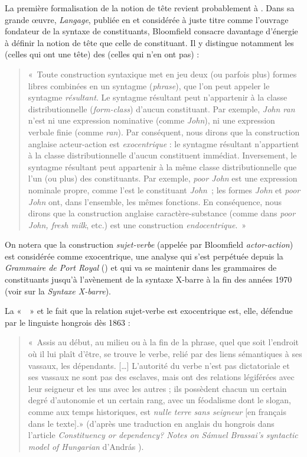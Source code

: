 {    La première formalisation de la notion de tête revient probablement à . Dans sa grande œuvre, \textit{Langage}, publiée en \citeyear{bloomfield1933language} et considérée à juste titre comme l’ouvrage fondateur de la syntaxe de constituants, Bloomfield consacre davantage d’énergie à définir la notion de tête que celle de constituant. Il y distingue notamment les  (celles qui ont une tête) des  (celles qui n’en ont pas) : 
    \begin{quote}«~Toute construction syntaxique met en jeu deux (ou parfois plus) formes libres combinées en un syntagme (\textit{phrase}), que l’on peut appeler le syntagme \textit{résultant}. Le syntagme résultant peut n’appartenir à la classe distributionnelle (\textit{form-class}) d’aucun constituant. Par exemple, \textit{John ran} n’est ni une expression nominative (comme \textit{John}), ni une expression verbale finie (comme \textit{ran}). Par conséquent, nous dirons que la construction anglaise acteur-action est \textit{exocentrique} : le syntagme résultant n’appartient à la classe distributionnelle d’aucun constituent immédiat. Inversement, le syntagme résultant peut appartenir à la même classe distributionnelle que l’un (ou plus) des constituants. Par exemple, \textit{poor John} est une expression nominale propre, comme l’est le constituant \textit{John~}; les formes \textit{John} et \textit{poor John} ont, dans l’ensemble, les mêmes fonctions. En conséquence, nous dirons que la construction anglaise caractère-substance (comme dans \textit{poor John, fresh milk}, etc.) est une construction \textit{endocentrique}.~» \end{quote} 
    On notera que la construction \textit{sujet-verbe} (appelée par Bloomfield \textit{actor-action}) est considérée comme exocentrique, une analyse qui s’est perpétuée depuis la \textit{Grammaire de Port Royal} (\citealt{ArnauldLancelot1660}) et qui va se maintenir dans les grammaires de constituants jusqu’à l’avènement de la syntaxe X-barre à la fin des années 1970 (voir  sur la \textit{Syntaxe X-barre}).

    La «~~» et le fait que la relation sujet-verbe est exocentrique est, elle, défendue par le linguiste hongrois  dès 1863 : 
    \begin{quote}«~Assis au début, au milieu ou à la fin de la phrase, quel que soit l’endroit où il lui plaît d’être, se trouve le verbe, relié par des liens sémantiques à ses vassaux, les dépendants. […] L’autorité du verbe n’est pas dictatoriale et ses vassaux ne sont pas des esclaves, mais ont des relations légiférées avec leur seigneur et les uns avec les autres ; ils possèdent chacun un certain degré d’autonomie et un certain rang, avec un féodalisme dont le slogan, comme aux temps historiques, est \textit{nulle terre sans seigneur} [en français dans le texte].» (d’après une traduction en anglais du hongrois dans l’article \textit{Constituency or dependency? Notes on Sámuel Brassai’s syntactic model of Hungarian} d’András \cite{imrenyi2013constituency}). \end{quote}

}
